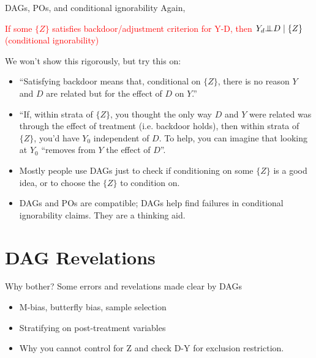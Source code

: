\documentclass[xcolor=dvipsnames]{beamer}
\newcommand{\indep}{{\bot\negthickspace\negthickspace\bot}}
\begin{document}
\begin{frame}{DAGs, POs, and conditional ignorability}
Again, \\
 \begin{center}
\textcolor{Red}{If some $\{Z\}$ satisfies backdoor/adjustment criterion for Y-D, then $Y_d \indep D \mid  \{Z\}$ (conditional ignorability)} \end{center}
\small
{} We won't show this rigorously, but try this on:
\begin{itemize}
\item<3-> ``Satisfying backdoor means that, conditional on $\{Z\}$, there is no reason $Y$ and $D$ are related but for the effect of $D$ on $Y$.''
\item<4->  ``If, within strata of $\{Z\}$, you thought the only way $D$ and $Y$ were related was through the effect of treatment (i.e. backdoor holds), then within strata of $\{Z\}$, you'd have $Y_0$ independent of $D$. To help, you can imagine that looking at $Y_0$ ``removes from $Y$ the effect of $D$''.
\end{itemize}

\begin{itemize}\setlength\itemsep{1em}
\item<5-> Mostly people use DAGs just to check if conditioning on some $\{Z\}$ is a good idea, or to choose the $\{Z\}$ to condition on.
\item<6-> DAGs and POs are compatible; DAGs help find failures in conditional ignorability claims. They are a thinking aid.
\end{itemize}
\end{frame}

\section{DAG Revelations}

\begin{frame}{Why bother? Some errors and revelations made clear by DAGs}
\begin{itemize} \setlength\itemsep{1em}
\item  M-bias, butterfly bias, sample selection
\item Stratifying on post-treatment variables
\item Why you cannot control for Z and check D-Y for exclusion restriction.
\end{itemize}
\end{frame}
\end{document}
